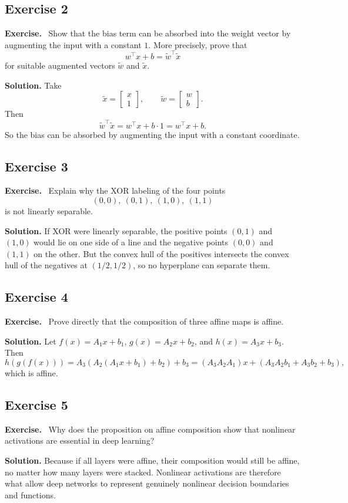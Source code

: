 \documentclass[11pt]{article}
\newenvironment{exercisebox}{\begin{framed}\noindent\textbf{Exercise.}\ }{\end{framed}}
\begin{document}
\subsection*{Exercise 2}
\begin{exercisebox}
Show that the bias term can be absorbed into the weight vector by augmenting the input with a constant $1$. More precisely, prove that
\[
w^\top x+b = \tilde w^\top \tilde x
\]
for suitable augmented vectors $\tilde w$ and $\tilde x$.
\end{exercisebox}
\textbf{Solution.} Take
\[
\tilde x=\begin{bmatrix}x\\1\end{bmatrix},\qquad \tilde w=\begin{bmatrix}w\\b\end{bmatrix}.
\]
Then
\[
\tilde w^\top \tilde x = w^\top x + b\cdot 1 = w^\top x+b.
\]
So the bias can be absorbed by augmenting the input with a constant coordinate.

\subsection*{Exercise 3}
\begin{exercisebox}
Explain why the XOR labeling of the four points
\[
(0,0),\ (0,1),\ (1,0),\ (1,1)
\]
is not linearly separable.
\end{exercisebox}
\textbf{Solution.} If XOR were linearly separable, the positive points $(0,1)$ and $(1,0)$ would lie on one side of a line and the negative points $(0,0)$ and $(1,1)$ on the other. But the convex hull of the positives intersects the convex hull of the negatives at $(1/2,1/2)$, so no hyperplane can separate them.

\subsection*{Exercise 4}
\begin{exercisebox}
Prove directly that the composition of three affine maps is affine.
\end{exercisebox}
\textbf{Solution.} Let $f(x)=A_1x+b_1$, $g(x)=A_2x+b_2$, and $h(x)=A_3x+b_3$. Then
\[
h(g(f(x)))=A_3(A_2(A_1x+b_1)+b_2)+b_3=(A_3A_2A_1)x + (A_3A_2b_1+A_3b_2+b_3),
\]
which is affine.

\subsection*{Exercise 5}
\begin{exercisebox}
Why does the proposition on affine composition show that nonlinear activations are essential in deep learning?
\end{exercisebox}
\textbf{Solution.} Because if all layers were affine, their composition would still be affine, no matter how many layers were stacked. Nonlinear activations are therefore what allow deep networks to represent genuinely nonlinear decision boundaries and functions.
\end{document}
